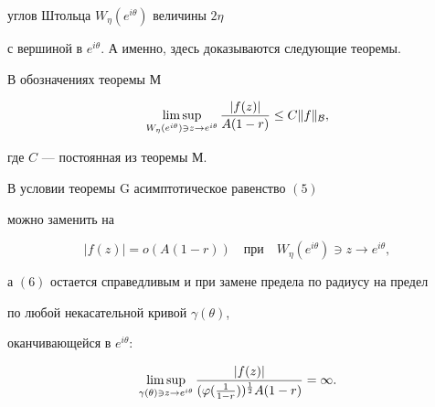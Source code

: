 углов Штольца $W_\eta(e^{i\theta})$ величины $2\eta$


с вершиной в $e^{i\theta}$. А именно, здесь доказываются следующие теоремы.





\begin{thm}


В обозначениях теоремы $\mathrm М$


$$


\limsup_{W_\eta(e^{i\theta})\ni z\to e^{i\theta}}\frac{|f(z)|}{A(1-r)}


\leq C\|f\|_{\Bl},


$$


где $C$ --- постоянная из теоремы $\mathrm М$.


\end{thm}





\begin{thm}


В условии теоремы $\mathrm G$ асимптотическое равенство $(5)$


можно заменить на


\begin{equation}


|f(z)|=o(A(1-r))


\quad \text{при} \quad W_\eta(e^{i\theta})\ni z\to e^{i\theta},


\end{equation}


а $(6)$ остается справедливым и при замене предела по радиусу на предел


по любой некасательной кривой $\gamma(\theta)$,


оканчивающейся в $e^{i\theta}{:}$


\begin{equation}


\limsup_{\gamma(\theta)\ni z\to e^{i\theta}}\frac{|f(z)|}{


(\p(\frac 1{1-r}))^{\frac 12}A(1-r)}=


\infty.


\end{equation}


\end{thm}











